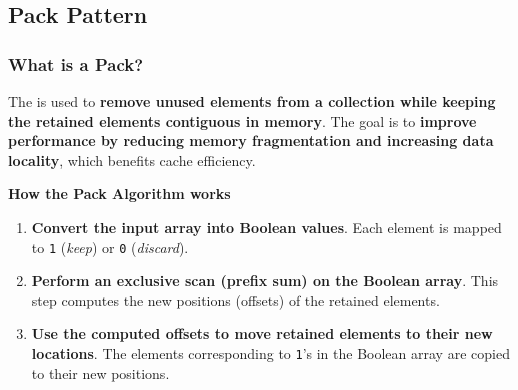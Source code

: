 \subsection{Pack Pattern}

\subsubsection{What is a Pack?}

The  is used to \textbf{remove unused elements from a collection while keeping the retained elements contiguous in memory}. The goal is to \textbf{improve performance by reducing memory fragmentation and increasing data locality}, which benefits cache efficiency.

\highspace
\begin{flushleft}
    \textcolor{Green3}{ \textbf{How the Pack Algorithm works}}
\end{flushleft}
\begin{enumerate}
    \item \textbf{Convert the input array into Boolean values}. Each element is mapped to \texttt{1} (\emph{keep}) or \texttt{0} (\emph{discard}).
    \item \textbf{Perform an exclusive scan (prefix sum) on the Boolean array}. This step computes the new positions (offsets) of the retained elements.
    \item \textbf{Use the computed offsets to move retained elements to their new locations}. The elements corresponding to \texttt{1}'s in the Boolean array are copied to their new positions.
\end{enumerate}
